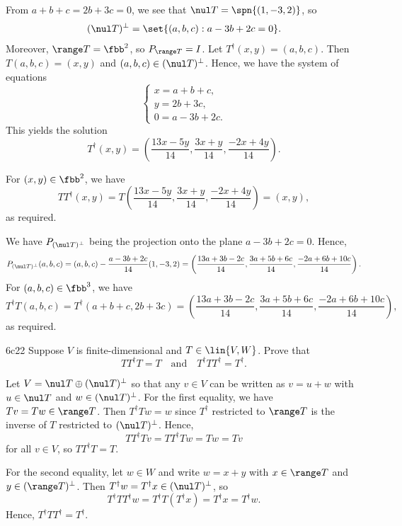 \begin{solenum}
    \item From $a + b + c = 2b + 3c = 0$, we see that $\nul T = \spn{(1, -3, 2)}$, so
    \[
        (\nul T)^\perp = \set{(a, b, c) : a - 3b + 2c = 0}.
    \]
    Moreover, $\range T = \fbb^2$, so $P_{\range T} = I$.
    Let $T^\dagger(x, y) = (a, b, c)$.
    Then $T(a, b, c) = (x, y)$ and $(a, b, c) \in (\nul T)^\perp$.
    Hence, we have the system of equations
    \[
        \begin{cases}
            x = a + b + c, \\
            y = 2b + 3c, \\
            0 = a - 3b + 2c.
        \end{cases}
    \]
    This yields the solution
    \[
        T^\dagger(x, y) = \left(\frac{13x - 5y}{14}, \frac{3x + y}{14}, \frac{-2x + 4y}{14}\right).
    \]
    \item For $(x, y) \in \fbb^2$, we have
    \[
        TT^\dagger(x, y) = T\left(\frac{13x - 5y}{14}, \frac{3x + y}{14}, \frac{-2x + 4y}{14}\right) = (x, y),
    \]
    as required.
    \item We have $P_{(\nul T)^\perp}$ being the projection onto the plane $a - 3b + 2c = 0$.
    Hence,
    \[
        P_{(\nul T)^\perp}(a, b, c) = (a, b, c) - \frac{a - 3b + 2c}{14}(1, -3, 2) = \left(\frac{13a + 3b - 2c}{14}, \frac{3a + 5b + 6c}{14}, \frac{-2a + 6b + 10c}{14}\right).
    \]
    For $(a, b, c) \in \fbb^3$, we have
    \[
        T^\dagger T(a, b, c) = T^\dagger(a + b + c, 2b + 3c) = \left(\frac{13a + 3b - 2c}{14}, \frac{3a + 5b + 6c}{14}, \frac{-2a + 6b + 10c}{14}\right),
    \]
    as required.
\end{solenum}

\begin{exercise}{6c22}
    Suppose $V$ is finite-dimensional and $T \in \lin{V, W}$.
    Prove that
    \[
        TT^\dagger T = T \quad \text{and} \quad T^\dagger TT^\dagger = T^\dagger.
    \]
\end{exercise}

\begin{sol}
    Let $V = \nul T \oplus (\nul T)^\perp$ so that any $v \in V$ can be written as $v = u + w$ with $u \in \nul T$ and $w \in (\nul T)^\perp$.
    For the first equality, we have $Tv = Tw \in \range T$.
    Then $T^\dagger Tw = w$ since $T^\dagger$ restricted to $\range T$ is the inverse of $T$ restricted to $(\nul T)^\perp$.
    Hence,
    \[
        TT^\dagger Tv = TT^\dagger Tw = Tw = Tv
    \]
    for all $v \in V$, so $TT^\dagger T = T$.

    For the second equality, let $w \in W$ and write $w = x + y$ with $x \in \range T$ and $y \in (\range T)^\perp$.
    Then $T^\dagger w = T^\dagger x \in (\nul T)^\perp$, so
    \[
        T^\dagger TT^\dagger w = T^\dagger T(T^\dagger x) = T^\dagger x = T^\dagger w.
    \]
    Hence, $T^\dagger TT^\dagger = T^\dagger$.
\end{sol}

